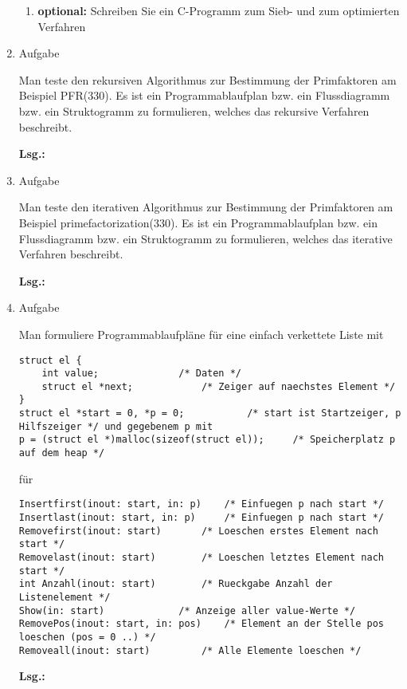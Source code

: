 \documentclass[12pt,a4paper,ngerman]{scrreprt}
\newcommand{\Lsg}{\par \textbf{Lsg.: } \hfill}
\begin{document}
\begin{enumerate}
\begin{enumerate}
\item \textbf{optional:} Schreiben Sie ein C-Programm zum Sieb- und zum optimierten Verfahren
\end{enumerate}

\item Aufgabe %

Man teste den rekursiven Algorithmus zur Bestimmung der Primfaktoren am
Beispiel PFR(330). Es ist ein Programmablaufplan bzw. ein Flussdiagramm bzw. ein Struktogramm zu formulieren, welches das rekursive Verfahren beschreibt.

\Lsg

\item Aufgabe %

Man teste den iterativen Algorithmus zur Bestimmung der Primfaktoren am
Beispiel primefactorization(330). Es ist ein Programmablaufplan bzw. ein Flussdiagramm bzw. ein Struktogramm zu formulieren, welches das iterative Verfahren beschreibt.

\Lsg

\item Aufgabe %

Man formuliere Programmablaufpläne für eine einfach verkettete Liste mit

\begin{lstlisting}
struct el {
	int value;				/* Daten */
	struct el *next;			/* Zeiger auf naechstes Element */
}
struct el *start = 0, *p = 0;			/* start ist Startzeiger, p Hilfszeiger */ und gegebenem p mit
p = (struct el *)malloc(sizeof(struct el)); 	/* Speicherplatz p auf dem heap */
\end{lstlisting}

für

\begin{lstlisting}
Insertfirst(inout: start, in: p)	/* Einfuegen p nach start */
Insertlast(inout: start, in: p)		/* Einfuegen p nach start */
Removefirst(inout: start)		/* Loeschen erstes Element nach start */
Removelast(inout: start)		/* Loeschen letztes Element nach start */
int Anzahl(inout: start)		/* Rueckgabe Anzahl der Listenelement */
Show(in: start)				/* Anzeige aller value-Werte */
RemovePos(inout: start, in: pos)	/* Element an der Stelle pos loeschen (pos = 0 ..) */
Removeall(inout: start)			/* Alle Elemente loeschen */
\end{lstlisting}

\Lsg


\end{enumerate}
\end{document}
